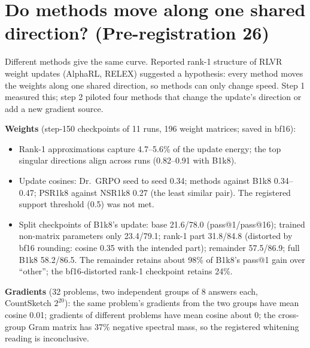 \documentclass[11pt]{article}
\begin{document}
\section{Do methods move along one shared direction? (Pre-registration 26)}
\begin{why}
Different methods give the same curve. Reported rank-1 structure of RLVR weight updates (AlphaRL, RELEX) suggested a hypothesis: every method moves the weights along one shared direction, so methods can only change speed. Step 1 measured this; step 2 piloted four methods that change the update's direction or add a new gradient source.
\end{why}
\textbf{Weights} (step-150 checkpoints of 11 runs, 196 weight matrices; saved in bf16):
\begin{itemize}[leftmargin=*,itemsep=1pt]
\item Rank-1 approximations capture 4.7--5.6\% of the update energy; the top singular directions align across runs (0.82--0.91 with B1k8).
\item Update cosines: Dr.\ GRPO seed to seed 0.34; methods against B1k8 0.34--0.47; PSR1k8 against NSR1k8 0.27 (the least similar pair). The registered support threshold (0.5) was not met.
\item Split checkpoints of B1k8's update: base 21.6/78.0 (pass@1/pass@16); trained non-matrix parameters only 23.4/79.1; rank-1 part 31.8/84.8 (distorted by bf16 rounding: cosine 0.35 with the intended part); remainder 57.5/86.9; full B1k8 58.2/86.5. The remainder retains about 98\% of B1k8's pass@1 gain over ``other''; the bf16-distorted rank-1 checkpoint retains 24\%.
\end{itemize}
\textbf{Gradients} (32 problems, two independent groups of 8 answers each, CountSketch $2^{20}$): the same problem's gradients from the two groups have mean cosine 0.01; gradients of different problems have mean cosine about 0; the cross-group Gram matrix has 37\% negative spectral mass, so the registered whitening reading is inconclusive.
\end{document}
